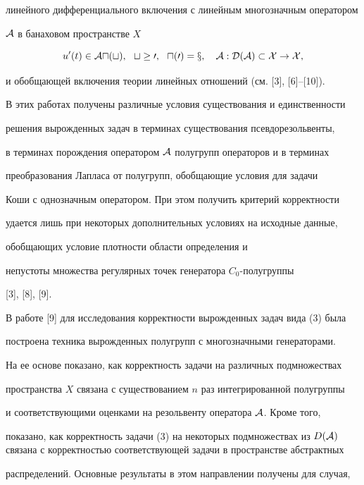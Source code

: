 линейного дифференциального включения с линейным многозначным оператором 


$\cal A$ в банаховом пространстве $X$ 


\begin{equation} 


u'(t)\in\cal A u(t),\ \ t\ge0,\ \ u(0)=x,\quad 


\cal A:D(\cal A)\subset X\to X,


\end{equation} 


и обобщающей включения теории линейных отношений (см. [3], [6]--[10]). 


В этих работах получены различные условия существования и единственности 


решения вырожденных задач в терминах существования псевдорезольвенты, 


в терминах порождения оператором $\cal A$ полугрупп операторов и в терминах 


преобразования Лапласа от полугрупп, обобщающие условия для задачи 


Коши с однозначным оператором. При этом получить критерий корректности 


удается лишь при некоторых дополнительных условиях на исходные данные, 


обобщающих условие плотности области определения и 


непустоты множества регулярных точек генератора $C_0$-полугруппы 


[3], [8], [9]. 


 


В работе [9] для исследования корректности вырожденных задач вида (3) была 


построена техника вырожденных полугрупп с многозначными генераторами. 


На ее основе показано, как корректность задачи на различных подмножествах 


пространства $X$ связана с существованием $n$ раз интегрированной полугруппы 


и соответствующими оценками на резольвенту оператора $\cal A$. Кроме того, 


показано, как корректность задачи (3) на некоторых подмножествах из $D(\cal 


A)$ связана с корректностью соответствующей задачи в пространстве абстрактных 


распределений. Основные результаты в этом направлении получены для случая, 


